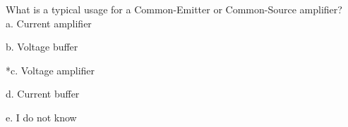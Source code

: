 
What is a typical usage for a Common-Emitter or Common-Source amplifier? \\

a. Current amplifier

b. Voltage buffer

*c. Voltage amplifier

d. Current buffer

e. I do not know \\ 
